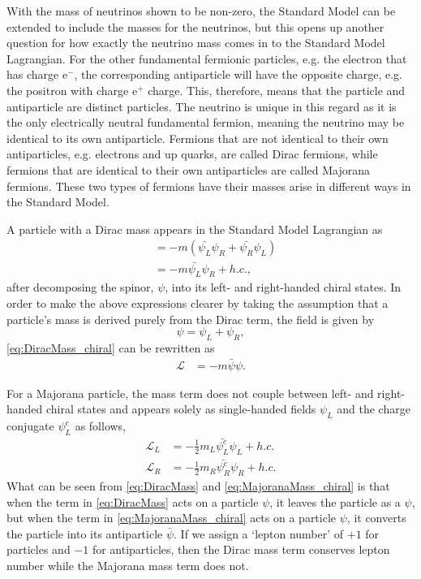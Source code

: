 With the mass of neutrinos shown to be non-zero, the Standard Model can be extended to include the masses for the neutrinos, but this opens up another question for how exactly the neutrino mass comes in to the Standard Model Lagrangian.
For the other fundamental fermionic particles, e.g. the electron that has charge $\textrm{e}^-$, the corresponding antiparticle will have the opposite charge, e.g. the positron with charge $\textrm{e}^+$ charge.
This, therefore, means that the particle and antiparticle are distinct particles.
The neutrino is unique in this regard as it is the only electrically neutral fundamental fermion, meaning the neutrino may be identical to its own antiparticle.
Fermions that are not identical to their own antiparticles, e.g. electrons and up quarks, are called Dirac fermions, while fermions that are identical to their own antiparticles are called Majorana fermions.
These two types of fermions have their masses arise in different ways in the Standard Model.

A particle with a Dirac mass appears in the Standard Model Lagrangian as
\begin{align}
&= -m(\bar{\psi_L}\psi_R + \bar{\psi_R}\psi_L) \\
&= -m\bar{\psi_L}\psi_R + h.c.,
\label{eq:DiracMass_chiral}
\end{align}
after decomposing the spinor, $\psi$, into its left- and right-handed chiral states.
In order to make the above expressions clearer by taking the assumption that a particle's mass is derived purely from the Dirac term, the field is given by
\begin{equation}
\psi = \psi_L + \psi_R,
\end{equation}
\autoref{eq:DiracMass_chiral} can be rewritten as
\begin{align}
\mathcal{L} &= -m\bar{\psi}\psi. \label{eq:DiracMass}
\end{align}

For a Majorana particle, the mass term does not couple between left- and right-handed chiral states and appears solely as single-handed fields $\psi_L$ and the charge conjugate $\psi_L^c$ as follows,
\begin{align}
\mathcal{L}_L &= -\frac{1}{2}m_L\bar{\psi^c_L}\psi_L+h.c. \label{eq:MajoranaMass_chiral} \\
\mathcal{L}_R &= -\frac{1}{2}m_R\bar{\psi^c_R}\psi_R+h.c.
\end{align}
What can be seen from \autoref{eq:DiracMass} and \autoref{eq:MajoranaMass_chiral} is that when the term in \autoref{eq:DiracMass} acts on a particle $\psi$, it leaves the particle as a $\psi$, but when the term in \autoref{eq:MajoranaMass_chiral} acts on a particle $\psi$, it converts the particle into its antiparticle $\bar{\psi}$.
If we assign a `lepton number' of $+1$ for particles and $-1$ for antiparticles, then the Dirac mass term conserves lepton number while the Majorana mass term does not.

